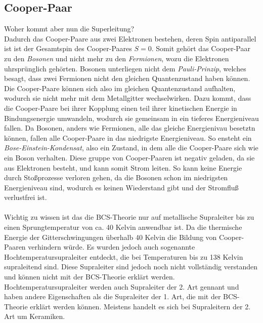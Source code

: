 \subsection{Cooper-Paar}
Woher kommt aber nun die Superleitung? \\
Dadurch das Cooper-Paare aus zwei Elektronen bestehen, deren Spin antiparallel ist ist der Gesamtspin des Cooper-Paares $S=0$.
Somit gehört das Cooper-Paar zu den \textit{Bosonen} und nicht mehr zu den \textit{Fermionen}, wozu die Elektronen uhrsprünglich gehörten.
Bosonen unterliegen nicht dem \textit{Pauli-Prinzip}, welches besagt, dass zwei Fermionen nicht den gleichen Quantenzustand haben können.
Die Cooper-Paare können sich also im gleichen Quantenzustand aufhalten, wodurch sie nicht mehr mit dem Metallgitter wechselwirken.
Dazu kommt, dass die Cooper-Paare bei ihrer Kopplung einen teil ihrer kinetischen Energie in Bindungsenergie umwandeln, wodurch sie 
gemeinsam in ein tieferes Energieniveau fallen. Da Bosonen, anders wie Fermionen, alle das gleiche Energienivau besetztn können, 
fallen alle Cooper-Paare in das niedrigste Energieniveau. So ensteht ein \textit{Bose-Einstein-Kondensat}, also ein Zustand, in dem
alle die Cooper-Paare sich wie ein Boson verhalten. Diese gruppe von Cooper-Paaren ist negativ geladen, da sie aus Elektronen besteht,
und kann somit Strom leiten. So kann keine Energie durch Stoßprozesse verloren gehen, da die Bosonen schon im niedrigsten Energieniveau sind, 
wodurch es keinen Wiederstand gibt und der Stromfluß verlustfrei ist.\\
\\
Wichtig zu wissen ist das die BCS-Theorie nur auf metallische Supraleiter bis zu einen Sprungtemperatur von ca. 40 Kelvin anwendbar ist.
Da die thermische Energie der Gitterschwingungen überhalb 40 Kelvin die Bildung von Cooper-Paaren verhindern würde. Es wurden jedoch auch
sogenannte Hochtemperatursupraleiter entdeckt, die bei Temperaturen bis zu 138 Kelvin supraleitend sind. Diese Supraleiter sind jedoch noch nicht
vollständig verstanden und können nicht mit der BCS-Theorie erklärt werden. Hochtemperatursupraleiter werden auch 
Supraleiter der 2. Art gennant und haben andere Eigenschaften als die Supraleiter der 1. Art, die mit der BCS-Theorie erklärt werden können.
Meistens handelt es sich bei Supraleitern der 2. Art um Keramiken.